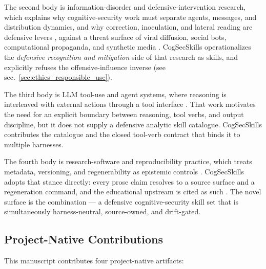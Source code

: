 \documentclass[
]{article}
\begin{document}
The second body is information-disorder and defensive-intervention
research, which explains why cognitive-security work must separate
agents, messages, and distribution dynamics, and why correction,
inoculation, and lateral reading are defensive levers
\citep{wardleDerakhshan2017informationDisorder, lewandowsky2012misinformationCorrection, roozenbeek2022inoculation, wineburg2019lateralReading},
against a threat surface of viral diffusion, social bots, computational
propaganda, and synthetic media
\citep{vosoughi2018spread, ferrara2016socialBots, woolleyHoward2017computationalPropaganda, bradshawHoward2019globalDisinformation, mirskyLee2021deepfakes, lazer2018fakeNews}.
CogSecSkills operationalizes the \emph{defensive recognition and
mitigation} side of that research as skills, and explicitly refuses the
offensive-influence inverse (see sec.~\ref{sec:ethics_responsible_use}).

The third body is LLM tool-use and agent systems, where reasoning is
interleaved with external actions through a tool interface
\citep{yao2022react, schick2023toolformer}. That work motivates the need
for an explicit boundary between reasoning, tool verbs, and output
discipline, but it does not supply a defensive analytic skill catalogue.
CogSecSkills contributes the catalogue and the closed tool-verb contract
that binds it to multiple harnesses.

The fourth body is research-software and reproducibility practice, which
treats metadata, versioning, and regenerability as epistemic controls
\citep{sandve2013reproducible, wilkinson2016fair, smith2016softwareCitation, c2pa2026spec}.
CogSecSkills adopts that stance directly: every prose claim resolves to
a source surface and a regeneration command, and the educational
upstream is cited as such \citep{ageint2026}. The novel surface is the
combination --- a defensive cognitive-security skill set that is
simultaneously harness-neutral, source-owned, and drift-gated.

\subsection{Project-Native
Contributions}\label{project-native-contributions}

This manuscript contributes four project-native artifacts:
\end{document}
